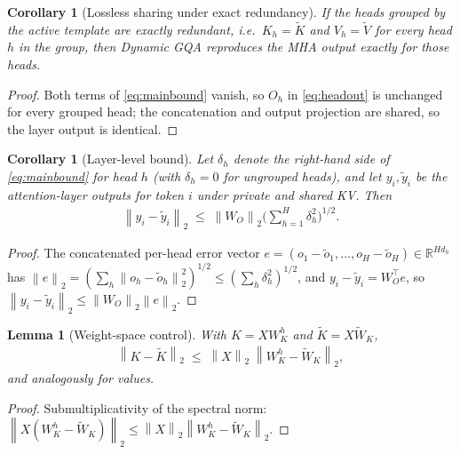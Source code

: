 \documentclass{article}
\newtheorem{lemma}[theorem]{Lemma}
\newtheorem{corollary}[theorem]{Corollary}
\newcommand{\R}{\mathbb{R}}
\newcommand{\norm}[1]{\left\lVert #1 \right\rVert}
\newcommand{\opnorm}[1]{\left\lVert #1 \right\rVert_{2}}
\begin{document}
\begin{corollary}[Lossless sharing under exact redundancy]
\label{cor:lossless}
If the heads grouped by the active template are exactly redundant, i.e.\
$K_h = \tilde K$ and $V_h = \tilde V$ for every head $h$ in the group, then
Dynamic GQA reproduces the MHA output exactly for those heads.
\end{corollary}

\begin{proof}
Both terms of \eqref{eq:mainbound} vanish, so $O_h$ in \eqref{eq:headout} is
unchanged for every grouped head; the concatenation and output projection
are shared, so the layer output is identical.
\end{proof}

\begin{corollary}[Layer-level bound]
\label{cor:layer}
Let $\delta_h$ denote the right-hand side of \eqref{eq:mainbound} for head
$h$ (with $\delta_h = 0$ for ungrouped heads), and let $y_i, \tilde y_i$ be
the attention-layer outputs for token $i$ under private and shared KV. Then
\begin{align}
\norm{y_i - \tilde y_i}_2 \;\le\; \opnorm{W_O} \Big( \textstyle\sum_{h=1}^{H} \delta_h^2 \Big)^{1/2}.
\end{align}
\end{corollary}

\begin{proof}
The concatenated per-head error vector
$e = (o_1 - \tilde o_1, \dots, o_H - \tilde o_H) \in \R^{H d_h}$ has
$\norm{e}_2 = (\sum_h \norm{o_h - \tilde o_h}_2^2)^{1/2} \le (\sum_h \delta_h^2)^{1/2}$,
and $y_i - \tilde y_i = W_O^\top e$, so
$\norm{y_i - \tilde y_i}_2 \le \opnorm{W_O} \norm{e}_2$.
\end{proof}

\begin{lemma}[Weight-space control]
\label{lem:weightspace}
With $K = X W_K^h$ and $\tilde K = X \tilde W_K$,
\begin{align}
\opnorm{K - \tilde K} \;\le\; \opnorm{X}\; \opnorm{W_K^h - \tilde W_K},
\end{align}
and analogously for values.
\end{lemma}

\begin{proof}
Submultiplicativity of the spectral norm:
$\opnorm{X(W_K^h - \tilde W_K)} \le \opnorm{X} \opnorm{W_K^h - \tilde W_K}$.
\end{proof}
\end{document}
